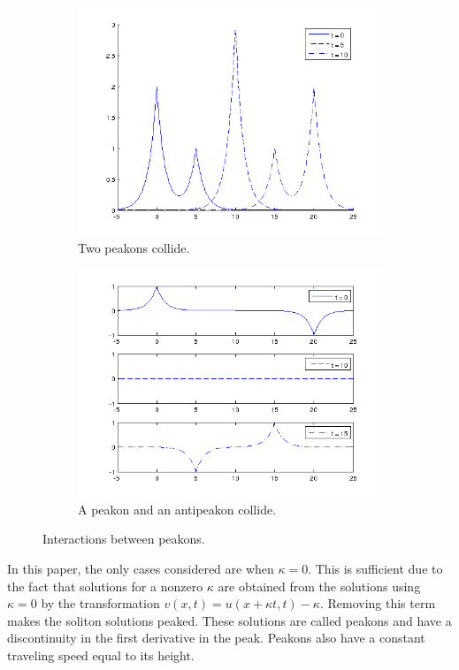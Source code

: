 \begin{figure}[h]
\begin{subfigure}[b]{0.49\textwidth}
                \includegraphics[width=\textwidth]{gfx/peakonovertake}
                \caption{Two peakons collide.}
                \label{fig:peakonovertake}
        \end{subfigure}
        \begin{subfigure}[b]{0.49\textwidth}
                \includegraphics[width=\textwidth]{gfx/peakonantipeakon}
                \caption{A peakon and an antipeakon collide.}
                \label{fig:peakonantipeakon}
        \end{subfigure}
        \caption{Interactions between peakons.}
\end{figure}

In this paper, the only cases considered are when $\kappa = 0$. This is sufficient due to the fact that solutions for a nonzero $\kappa$ are obtained from the solutions using $\kappa = 0$ by the transformation $v(x,t) = u(x + \kappa t, t) - \kappa$. Removing this term makes the soliton solutions peaked. These solutions are called peakons and have a discontinuity in the first derivative in the peak. Peakons also have a constant traveling speed equal to its height.

